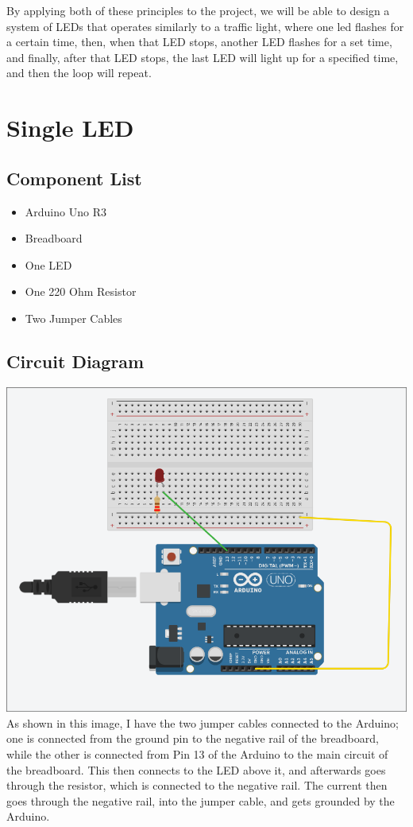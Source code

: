 \documentclass[12pt]{article}
\begin{document}
By applying both of these principles to the project, we will be able to design a system of LEDs that operates similarly to a traffic light, where one led flashes for a certain time, then, when that LED stops, another LED flashes for a set time, and finally, after that LED stops, the last LED will light up for a specified time, and then the loop will repeat. 


\section{Single LED}


\subsection{Component List}

\begin{itemize}
\item Arduino Uno R3
\item Breadboard
\item One LED
\item One 220 Ohm Resistor
\item Two Jumper Cables
\end{itemize}

\subsection{Circuit Diagram}
\includegraphics[width=1.0\textwidth]{One_LED_Diagram.png}
As shown in this image, I have the two jumper cables connected to the Arduino; one is connected from the ground pin to the negative rail of the breadboard, while the other is connected from Pin 13 of the Arduino to the main circuit of the breadboard. This then connects to the LED above it, and afterwards goes through the resistor, which is connected to the negative rail. The current then goes through the negative rail, into the jumper cable, and gets grounded by the Arduino. 
\end{document}
